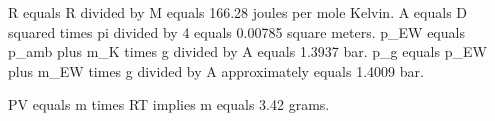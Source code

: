 R equals R divided by M equals 166.28 joules per mole Kelvin.  
A equals D squared times pi divided by 4 equals 0.00785 square meters.  
p_EW equals p_amb plus m_K times g divided by A equals 1.3937 bar.  
p_g equals p_EW plus m_EW times g divided by A approximately equals 1.4009 bar.  

PV equals m times RT implies m equals 3.42 grams.